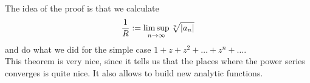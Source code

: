 The idea of the proof is that we calculate
\begin{align*}
	\frac{1}{R} := \limsup_{n \to \infty}\sqrt[n]{\vert a_n\vert}
\end{align*}
and do what we did for the simple case $1 + z + z^2 + \ldots + z^n + \ldots$.\\
This theorem is very nice, since it tells us that the places where the power series converges is quite nice. It also allows to build new analytic functions.
